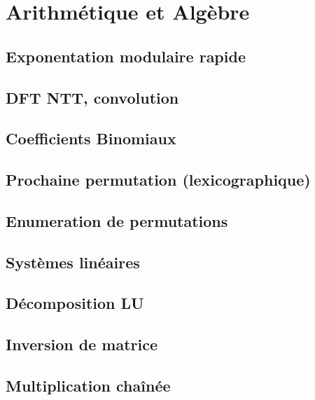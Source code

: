 \documentclass[10pt]{extarticle}
\begin{document}
\section{Arithmétique et Algèbre}
\subsection{Exponentation modulaire rapide}
{\scriptsize}

\subsection{DFT NTT, convolution}
{\scriptsize}

\subsection{Coefficients Binomiaux}
{\scriptsize}

\subsection{Prochaine permutation (lexicographique)}
{\scriptsize}

\subsection{Enumeration de permutations}
{\scriptsize}

\subsection{Systèmes linéaires}
{\scriptsize}

\subsection{Décomposition LU}
{\scriptsize}

\subsection{Inversion de matrice}
{\scriptsize}

\subsection{Multiplication chaînée}
{\scriptsize}
\end{document}

